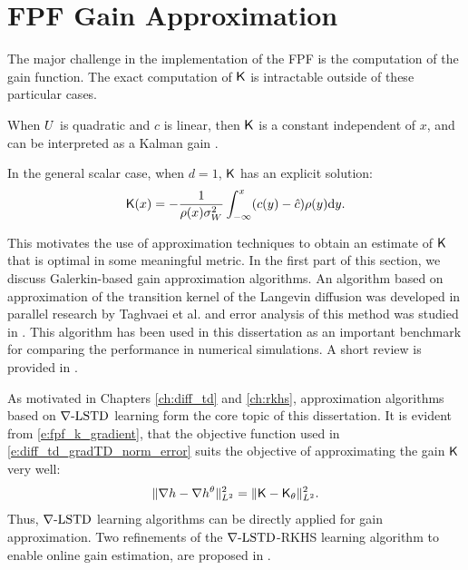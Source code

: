 \section{FPF Gain Approximation}
The major challenge in the implementation of the FPF is the computation of the gain function. The exact computation of $\text{\sf K}$ is intractable outside of these particular cases. 
\begin{romannum}
\item When $U$ is quadratic and $c$ is linear,  then $\text{\sf K}$ is a constant independent of $x$, and can be interpreted as a Kalman gain \cite{yanlaumehmey13}. 

\item In the general scalar case, when $d=1$, $\text{\sf K}$ has an explicit solution:
\begin{equation}
\kFPF(x) = - \frac{1}{\pr(x) \sigma_W^2} \int_{-\infty}^{x} (c(y) - \hat{c}) \pr(y) \ud y.
\label{e:fpf_gain_1d}
\end{equation}
\end{romannum}

This motivates the use of approximation techniques to obtain an estimate of $\text{\sf K}$ that is optimal in some meaningful metric. In the first part of this section, we discuss Galerkin-based gain approximation algorithms. An algorithm based on approximation of the transition kernel of the Langevin diffusion was developed in parallel research by Taghvaei et al. \cite{tagmeh16} and error analysis of this method was studied in \cite{tagmehmey17}. This algorithm has been used in this dissertation as an important benchmark for comparing the performance in numerical simulations. A short review is provided in . 

As motivated in Chapters \ref{ch:diff_td} and \ref{ch:rkhs}, approximation algorithms based on $\nabla\text{-LSTD}$ learning form the core topic of this dissertation. It is evident from \eqref{e:fpf_k_gradient}, that the objective function used in \eqref{e:diff_td_gradTD_norm_error} suits the objective of approximating the gain $\text{\sf K}$ very well:
\begin{equation}
\| \nabla h - \nabla h^\theta \|^2_{L^2} = \| \text{\sf K} - \text{\sf K}_\theta \|^2_{L^2}.
\end{equation}
Thus, $\nabla\text{-LSTD}$ learning algorithms can be directly applied for gain approximation. Two refinements of the $\nabla\text{-LSTD}$-RKHS learning algorithm to enable online gain estimation, are proposed in .

